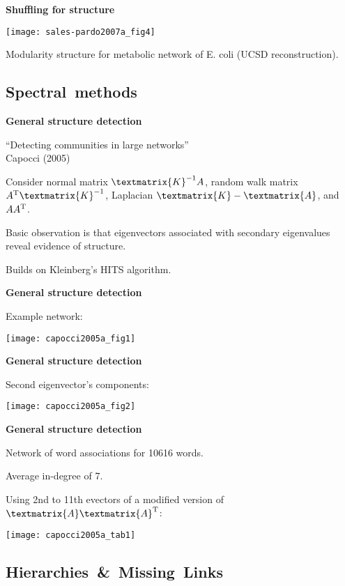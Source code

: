   \textbf{Shuffling for structure}

      
    \texttt{[image: sales-pardo2007a\_fig4]}
    
    
    
      Modularity structure for 
      metabolic network of E. coli
      (UCSD reconstruction).
    
  


\subsection{Spectral\ methods}

  \textbf{General structure detection}

  
   
    ``Detecting communities in large networks''\\
    Capocci \etal (2005)\cite{capocci2005a}
   
    Consider normal matrix $\textmatrix{K}^{-1} A$,
    random walk matrix $A^{\textnormal{T}} \textmatrix{K}^{-1}$,
    Laplacian $\textmatrix{K} - \textmatrix{A}$,
    and $A A^{\textnormal{T}}$.
  
    Basic observation is that eigenvectors
    associated with secondary eigenvalues
    reveal evidence of structure.
  
    Builds on Kleinberg's HITS algorithm.
  



  \textbf{General structure detection}

  
   Example network:
  

  \texttt{[image: capocci2005a\_fig1]}


  \textbf{General structure detection}

  
   
    Second eigenvector's components:
  

  \texttt{[image: capocci2005a\_fig2]}


  \textbf{General structure detection}

  
  
    Network of word associations for 10616 words.
  
    Average in-degree of 7.
   
    Using 2nd to 11th evectors of a modified
    version of $\textmatrix{A} \textmatrix{A}^{\textnormal{T}}$:
  

  \texttt{[image: capocci2005a\_tab1]}


\subsection{Hierarchies\ \&\ Missing\ Links}

